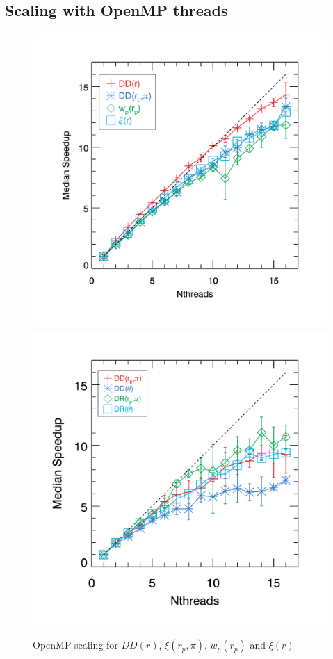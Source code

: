 \documentclass[preprint, 12pt, authoryear]{elsarticle}
\newcommand{\xir}{\ensuremath{{DD(r)}}\xspace}
\newcommand{\xiofr}{\ensuremath{{\xi(r)}}\xspace}
\newcommand{\wprp}{\ensuremath{{w_p(r_p)}}\xspace}
\newcommand{\xirppi}{\ensuremath{{\xi(r_p,\pi)}}\xspace}
\begin{document}
\subsection{Scaling with OpenMP threads}
\begin{figure}[htbp]
\includegraphics[clip=true,width=0.5\linewidth]{timings_Mr19_openmp}%
\includegraphics[clip=true,width=0.5\linewidth]{timings_Mr19_mocks_openmp}
\caption{OpenMP scaling for \xir, \xirppi, \wprp and \xiofr}
\label{fig:scaling_openmp}
\end{figure}
\end{document}

